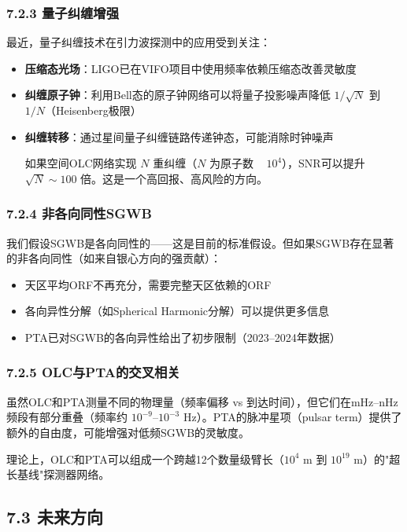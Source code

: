 \documentclass[12pt,a4paper]{article}
\begin{document}
\subsubsection{7.2.3 量子纠缠增强}


最近，量子纠缠技术在引力波探测中的应用受到关注：
\begin{itemize}
  \item \textbf{压缩态光场}：LIGO已在VIFO项目中使用频率依赖压缩态改善灵敏度
  \item \textbf{纠缠原子钟}：利用Bell态的原子钟网络可以将量子投影噪声降低 $1/\sqrt{N}$ 到 $1/N$（Heisenberg极限）
  \item \textbf{纠缠转移}：通过星间量子纠缠链路传递钟态，可能消除时钟噪声

如果空间OLC网络实现 $N$ 重纠缠（$N$ 为原子数 ~ $10^4$），SNR可以提升 $\sqrt{N} \sim 100$ 倍。这是一个高回报、高风险的方向。

\end{itemize}
\subsubsection{7.2.4 非各向同性SGWB}


我们假设SGWB是各向同性的——这是目前的标准假设。但如果SGWB存在显著的非各向同性（如来自银心方向的强贡献）：

\begin{itemize}
  \item 天区平均ORF不再充分，需要完整天区依赖的ORF
  \item 各向异性分解（如Spherical Harmonic分解）可以提供更多信息
  \item PTA已对SGWB的各向异性给出了初步限制（2023–2024年数据）

\end{itemize}
\subsubsection{7.2.5 OLC与PTA的交叉相关}


虽然OLC和PTA测量不同的物理量（频率偏移 vs 到达时间），但它们在mHz–nHz频段有部分重叠（频率约 $10^{-9}$–$10^{-3}$ Hz）。PTA的脉冲星项（pulsar term）提供了额外的自由度，可能增强对低频SGWB的灵敏度。

理论上，OLC和PTA可以组成一个跨越12个数量级臂长（$10^4$ m 到 $10^{19}$ m）的"超长基线"探测器网络。

\subsection{7.3 未来方向}
\end{document}

